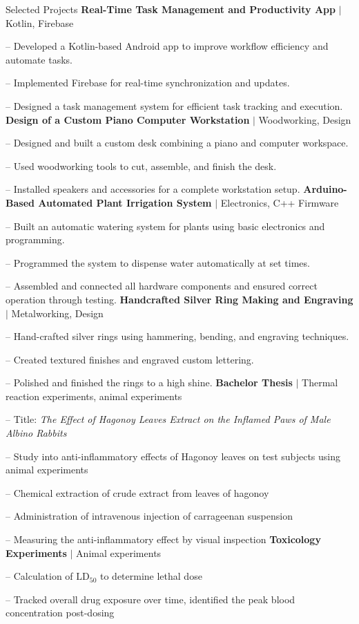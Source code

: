 
\begin{rubric}{\faTasks[solid]  Selected Projects}
\entry*[2026][]%
	\textbf{Real-Time Task Management and Productivity App} $|$ Kotlin, Firebase \par
	-- Developed a Kotlin-based Android app to improve workflow efficiency and automate tasks.\par
	-- Implemented Firebase for real-time synchronization and updates. \par
    -- Designed a task management system for efficient task tracking and execution.
%
	\entry*[2026][]%
	\textbf{Design of a Custom Piano Computer Workstation} $|$ Woodworking, Design \par
	-- Designed and built a custom desk combining a piano and computer workspace. \par
	-- Used woodworking tools to cut, assemble, and finish the desk. \par
	-- Installed speakers and accessories for a complete workstation setup.
%
\entry*[2024][]%
	\textbf{Arduino-Based Automated Plant Irrigation System} $|$ Electronics, C++ Firmware \par
	-- Built an automatic watering system for plants using basic electronics and programming. \par
	-- Programmed the system to dispense water automatically at set times. \par
	-- Assembled and connected all hardware components and ensured correct operation through testing.
%
\entry*[2023][]%
	\textbf{Handcrafted Silver Ring Making and Engraving} $|$ Metalworking, Design \par
	-- Hand-crafted silver rings using hammering, bending, and engraving techniques. \par
	-- Created textured finishes and engraved custom lettering. \par
	-- Polished and finished the rings to a high shine.
%
\entry*[2015][]%
	\textbf{Bachelor Thesis } $|$ Thermal reaction experiments, animal experiments \par
	-- Title: \emph{The Effect of Hagonoy Leaves Extract on the Inflamed Paws of Male Albino Rabbits} \par
	-- Study into anti-inflammatory effects of Hagonoy leaves on test subjects using animal experiments \par
	-- Chemical extraction of crude extract from leaves of hagonoy \par
	-- Administration of intravenous injection of carrageenan suspension \par
	-- Measuring the anti-inflammatory effect by visual inspection 
%
\entry*[2015][] \textbf{Toxicology Experiments} $|$ Animal experiments \par
	-- Calculation of $\mathrm{LD}_{50}$ to determine lethal dose \par
	-- Tracked overall drug exposure over time, identified the peak blood concentration post-dosing 
%
\end{rubric}
